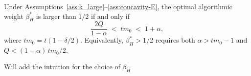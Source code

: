 \begin{corollary}\label{cor:beta_0.5:Eng-Based}
    Under Assumptions~\ref{ass:k_large}--\ref{ass:concavity-E}, the optimal algorithmic weight $\beta_H^*$ is larger than $1/2$ if and only if
    \[
        \frac{2Q}{1-\alpha} \;<\; tm_0 \;<\; 1+\alpha,
    \]
    where $tm_0 = t(1-\delta/2)$. Equivalently, $\beta_H^* > 1/2$ requires both $\alpha > tm_0 - 1$ and $Q < (1-\alpha)\,tm_0/2$.
\end{corollary}

{\color{red} Will add the intuition for the choice of $\beta_H$}



